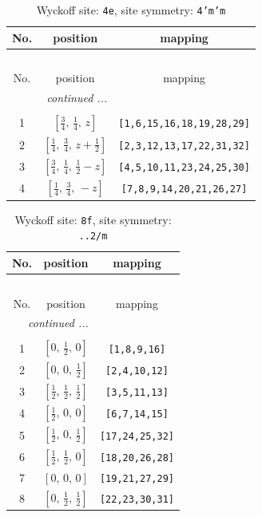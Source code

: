 \documentclass[fleqn,8pt]{jsarticle}
\begin{document}
\renewcommand{\arraystretch}{1.2}
\begin{longtable}{ccc}
\caption{Wyckoff site: {\tt 4e}, site symmetry: {\tt 4'm'm}}
 \\
 \hline \hline
No. & position & mapping \\ \hline \endfirsthead

\multicolumn{2}{l}{\tablename\ \thetable{}} \\
 \hline \hline
No. & position & mapping \\ \hline \endhead

 \hline \hline
\multicolumn{2}{r}{\footnotesize\it continued ...} \\ \endfoot

 \hline \hline
\multicolumn{2}{r}{} \\ \endlastfoot

1 & $\left[ \frac{3}{4},\, \frac{1}{4},\, z \right]$ & {\tt [1,6,15,16,18,19,28,29]} \\ \hline
2 & $\left[ \frac{1}{4},\, \frac{3}{4},\, z + \frac{1}{2} \right]$ & {\tt [2,3,12,13,17,22,31,32]} \\ \hline
3 & $\left[ \frac{3}{4},\, \frac{1}{4},\, \frac{1}{2} - z \right]$ & {\tt [4,5,10,11,23,24,25,30]} \\ \hline
4 & $\left[ \frac{1}{4},\, \frac{3}{4},\, - z \right]$ & {\tt [7,8,9,14,20,21,26,27]} \\
\end{longtable}
\renewcommand{\arraystretch}{1.2}
\begin{longtable}{ccc}
\caption{Wyckoff site: {\tt 8f}, site symmetry: {\tt ..2/m}}
 \\
 \hline \hline
No. & position & mapping \\ \hline \endfirsthead

\multicolumn{2}{l}{\tablename\ \thetable{}} \\
 \hline \hline
No. & position & mapping \\ \hline \endhead

 \hline \hline
\multicolumn{2}{r}{\footnotesize\it continued ...} \\ \endfoot

 \hline \hline
\multicolumn{2}{r}{} \\ \endlastfoot

1 & $\left[ 0,\, \frac{1}{2},\, 0 \right]$ & {\tt [1,8,9,16]} \\ \hline
2 & $\left[ 0,\, 0,\, \frac{1}{2} \right]$ & {\tt [2,4,10,12]} \\ \hline
3 & $\left[ \frac{1}{2},\, \frac{1}{2},\, \frac{1}{2} \right]$ & {\tt [3,5,11,13]} \\ \hline
4 & $\left[ \frac{1}{2},\, 0,\, 0 \right]$ & {\tt [6,7,14,15]} \\ \hline
5 & $\left[ \frac{1}{2},\, 0,\, \frac{1}{2} \right]$ & {\tt [17,24,25,32]} \\ \hline
6 & $\left[ \frac{1}{2},\, \frac{1}{2},\, 0 \right]$ & {\tt [18,20,26,28]} \\ \hline
7 & $\left[ 0,\, 0,\, 0 \right]$ & {\tt [19,21,27,29]} \\ \hline
8 & $\left[ 0,\, \frac{1}{2},\, \frac{1}{2} \right]$ & {\tt [22,23,30,31]} \\
\end{longtable}
\end{document}
